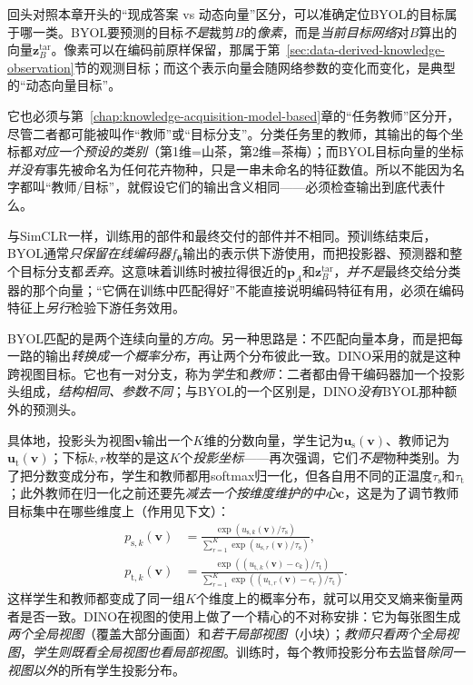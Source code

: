 回头对照本章开头的“现成答案 vs 动态向量”区分，可以准确定位BYOL的目标属于哪一类。BYOL要预测的目标\emph{不是}裁剪$B$的\emph{像素}，而是\emph{当前目标网络}对$B$算出的向量$\bm{z}^{\mathrm{tar}}_B$。像素可以在编码前原样保留，那属于第~\ref{sec:data-derived-knowledge-observation}节的观测目标；而这个表示向量会随网络参数的变化而变化，是典型的“动态向量目标”。

它也必须与第~\ref{chap:knowledge-acquisition-model-based}章的“任务教师”区分开，尽管二者都可能被叫作“教师”或“目标分支”。分类任务里的教师，其输出的每个坐标都\emph{对应一个预设的类别}（第1维=山茶，第2维=茶梅）；而BYOL目标向量的坐标\emph{并没有}事先被命名为任何花卉物种，只是一串未命名的特征数值。所以不能因为名字都叫“教师/目标”，就假设它们的输出含义相同——必须检查输出到底代表什么。

与SimCLR一样，训练用的部件和最终交付的部件并不相同。预训练结束后，BYOL通常\emph{只保留在线编码器}$f_{\bm{\theta}}$输出的表示供下游使用，而把投影器、预测器和整个目标分支都\emph{丢弃}。这意味着训练时被拉得很近的$\bm{p}_A$和$\bm{z}^{\mathrm{tar}}_B$，\emph{并不是}最终交给分类器的那个向量；“它俩在训练中匹配得好”不能直接说明编码特征有用，必须在编码特征上\emph{另行}检验下游任务效用。

BYOL匹配的是两个连续向量的\emph{方向}。另一种思路是：不匹配向量本身，而是把每一路的输出\emph{转换成一个概率分布}，再让两个分布彼此一致。DINO采用的就是这种跨视图目标。它也有一对分支，称为\emph{学生}和\emph{教师}：二者都由骨干编码器加一个投影头组成，\emph{结构相同、参数不同}；与BYOL的一个区别是，DINO\emph{没有}BYOL那种额外的预测头。

具体地，投影头为视图$\bm{v}$输出一个$K$维的分数向量，学生记为$\bm{u}_{\mathrm{s}}(\bm{v})$、教师记为$\bm{u}_{\mathrm{t}}(\bm{v})$；下标$k,r$枚举的是这$K$个\emph{投影坐标}——再次强调，它们\emph{不是}物种类别。为了把分数变成分布，学生和教师都用softmax归一化，但各自用不同的正温度$\tau_{\mathrm{s}}$和$\tau_{\mathrm{t}}$；此外教师在归一化之前还要先\emph{减去一个按维度维护的中心}$\bm{c}$，这是为了调节教师目标集中在哪些维度上（作用见下文）：
\begin{align}
  p_{\mathrm{s},k}(\bm{v})
  &=\frac{\exp(u_{\mathrm{s},k}(\bm{v})/\tau_{\mathrm{s}})}
  {\sum_{r=1}^{K}\exp(u_{\mathrm{s},r}(\bm{v})/\tau_{\mathrm{s}})},\\
  p_{\mathrm{t},k}(\bm{v})
  &=\frac{\exp((u_{\mathrm{t},k}(\bm{v})-c_k)/\tau_{\mathrm{t}})}
  {\sum_{r=1}^{K}\exp((u_{\mathrm{t},r}(\bm{v})-c_r)/\tau_{\mathrm{t}})}.
  \label{eq:data-derived-knowledge-dino-distributions}
\end{align}
这样学生和教师都变成了同一组$K$个维度上的概率分布，就可以用交叉熵来衡量两者是否一致。DINO在视图的使用上做了一个精心的不对称安排：它为每张图生成\emph{两个全局视图}（覆盖大部分画面）和\emph{若干局部视图}（小块）；\emph{教师只看两个全局视图}，\emph{学生则既看全局视图也看局部视图}。训练时，每个教师投影分布去监督\emph{除同一视图以外}的所有学生投影分布。

